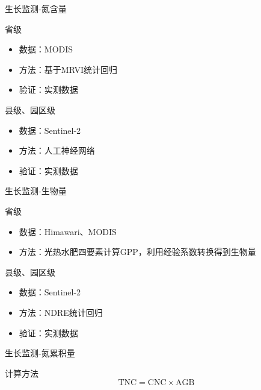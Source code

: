 \documentclass{beamer}
\begin{document}
\begin{frame}{生长监测-氮含量}
	\begin{block}{省级}
		\begin{itemize}
			\item 数据：MODIS
			\item 方法：基于MRVI统计回归
			\item 验证：实测数据
		\end{itemize}
	\end{block}
	
	\begin{block}{县级、园区级}
		\begin{itemize}
			\item 数据：Sentinel-2
			\item 方法：人工神经网络
			\item 验证：实测数据
		\end{itemize}
	\end{block}
\end{frame}
\begin{frame}{生长监测-生物量}
	\begin{block}{省级}
	\begin{itemize}
		\item 数据：Himawari、MODIS
		\item 方法：光热水肥四要素计算GPP，利用经验系数转换得到生物量
	\end{itemize}
\end{block}

\begin{block}{县级、园区级}
	\begin{itemize}
		\item 数据：Sentinel-2
		\item 方法：NDRE统计回归
		\item 验证：实测数据
	\end{itemize}
\end{block}
\end{frame}
\begin{frame}{生长监测-氮累积量}
	\begin{block}{计算方法}
		\begin{equation}
			\mathrm{TNC} = \mathrm{CNC}\times\mathrm{AGB}
		\end{equation}
	\end{block}
\end{frame}
\end{document}
